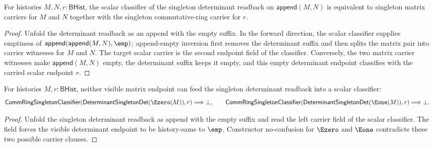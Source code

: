 
\begin{theorem}
\label{thm:determinant-singleton-det-append-pair-scalar-classifier}
For histories $M,N,r:\mathsf{BHist}$, the scalar classifier of the singleton
determinant readback on $\mathsf{append}(M,N)$ is equivalent to singleton
matrix carriers for $M$ and $N$ together with the singleton commutative-ring
carrier for $r$.
\end{theorem}
\begin{proof}
Unfold the determinant readback as an append with the empty suffix. In the
forward direction, the scalar classifier supplies emptiness of
$\mathsf{append}(\mathsf{append}(M,N),\emp)$; append-empty inversion first
removes the determinant suffix and then splits the matrix pair into carrier
witnesses for $M$ and $N$. The target scalar carrier is the second endpoint
field of the classifier. Conversely, the two matrix carrier witnesses make
$\mathsf{append}(M,N)$ empty, the determinant suffix keeps it empty, and this
empty determinant endpoint classifies with the carried scalar endpoint $r$.
\end{proof}

\begin{theorem}
\label{thm:determinant-singleton-det-visible-matrix-scalar-classifier-absurd}
For histories $M,r:\mathsf{BHist}$, neither visible matrix endpoint can feed
the singleton determinant readback into a scalar classifier:
$$
\mathsf{CommRingSingletonClassifier}
(\mathsf{DeterminantSingletonDet}(\Ezero(M)),r)\Longrightarrow\bot,
\qquad
\mathsf{CommRingSingletonClassifier}
(\mathsf{DeterminantSingletonDet}(\Eone(M)),r)\Longrightarrow\bot.
$$
\end{theorem}
\begin{proof}
Unfold the singleton determinant readback as append with the empty suffix and
read the left carrier field of the scalar classifier. The field forces the
visible determinant endpoint to be history-same to $\emp$. Constructor
no-confusion for $\Ezero$ and $\Eone$ contradicts these two possible carrier
clauses.
\end{proof}

